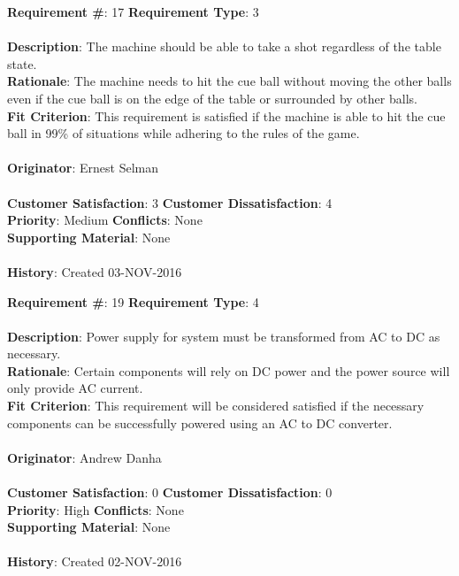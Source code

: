 \documentclass[titlepage]{article}
\begin{document}
\begin{framed}
	\noindent\textbf{Requirement \#}: 17 \hfill \textbf{Requirement Type}: 3 \hfill\\\\
	\noindent\textbf{Description}: The machine should be able to take a shot regardless of the table state.\\
	\textbf{Rationale}: The machine needs to hit the cue ball without moving the other balls even if the cue ball is on the edge of the table or surrounded by other balls. \\
	\textbf{Fit Criterion}: This requirement is satisfied if the machine is able to hit the cue ball in 99\% of situations while adhering to the rules of the game. \\\\
	\textbf{Originator}: Ernest Selman\\\\
	\noindent\textbf{Customer Satisfaction}: 3 \hfill 	\textbf{Customer Dissatisfaction}: 4 \hfill\\
	\textbf{Priority}: Medium \hfill \textbf{Conflicts}: None \hfill\\
	\textbf{Supporting Material}: None\\\\
	\noindent\textbf{History}: Created 03-NOV-2016
\end{framed}

\begin{framed}
	\noindent\textbf{Requirement \#}: 19 \hfill \textbf{Requirement Type}: 4 \hfill\\\\
	\noindent\textbf{Description}: Power supply for system must be transformed from AC to DC as necessary.\\
	\textbf{Rationale}: Certain components will rely on DC power and the power source will only provide AC current.\\
	\textbf{Fit Criterion}: This requirement will be considered satisfied if the necessary components can be successfully powered using an AC to DC converter.\\\\
	\textbf{Originator}: Andrew Danha\\\\ 
	\noindent\textbf{Customer Satisfaction}: 0 \hfill 	\textbf{Customer Dissatisfaction}: 0 \hfill\\
	\textbf{Priority}: High \hfill \textbf{Conflicts}: None \hfill\\
	\textbf{Supporting Material}: None\\\\
	\noindent\textbf{History}: Created 02-NOV-2016
\end{framed}
\end{document}
